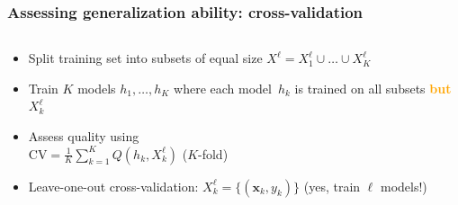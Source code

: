 \documentclass[usenames,dvipsnames,aspectratio=169]{beamer}
\begin{document}
\begin{frame}
\frametitle{Assessing generalization ability: cross-validation}

\begin{columns}
\begin{column}{0.6\textwidth}
    

\begin{itemize}
  \item Split training set into subsets of equal size $X^{\ell} = 
    X^{\ell}_{1} \cup \ldots \cup X^{\ell}_{K}$

  \pause
  \item Train $K$ models $h_1, \ldots, h_K$
  where each model~$h_k$ is trained on all subsets
  \textcolor{orange}{\textbf{but}} $X^{\ell}_k$
    
  \pause
  \item Assess quality using \\
  $\mathrm{CV} = \frac 1 K \sum\limits_{k=1}^K Q(h_k, X^{\ell}_k)$
  ($K$-fold)

  \pause
  \item Leave-one-out cross-validation:
    $X^{\ell}_k = \{(\mathbf{x}_k, y_k)\}$
    (yes, train $\ell$ models!)

\end{itemize}

\end{column}

\end{columns}

\end{frame}
\end{document}
